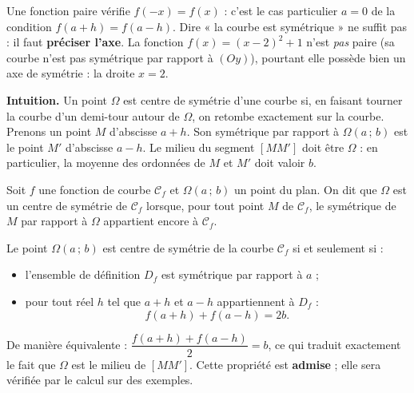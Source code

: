 \documentclass[11pt]{article}
\newcommand{\cle}[1]{{\popxbold\color{popdark}#1}}
\newcounter{popsec}
\newcounter{popsub}
\newcommand{\courssub}[1]{%
  \stepcounter{popsub}%
  \par\vspace{9pt}\noindent{\popxbold\fontsize{11.5}{13}\selectfont\color{popink}{\color{poporange}\thepopsec.\thepopsub}\hspace{6pt}#1}\par\nopagebreak\vspace{4pt}
}
\begin{document}
\begin{attention}[Ne pas confondre axe $(Oy)$ et axe $x = a$]
Une fonction paire vérifie $f(-x) = f(x)$ : c'est le cas particulier $a = 0$ de la condition $f(a+h) = f(a-h)$. Dire « la courbe est symétrique » ne suffit pas : il faut \textbf{préciser l'axe}. La fonction $f(x) = (x-2)^2 + 1$ n'est \emph{pas} paire (sa courbe n'est pas symétrique par rapport à $(Oy)$), pourtant elle possède bien un axe de symétrie : la droite $x = 2$.
\end{attention}

\courssub{Centre de symétrie $\Omega(a\,;\,b)$}

\textbf{Intuition.} Un point $\Omega$ est \cle{centre de symétrie} d'une courbe si, en faisant tourner la courbe d'un demi-tour autour de $\Omega$, on retombe exactement sur la courbe. Prenons un point $M$ d'abscisse $a + h$. Son symétrique par rapport à $\Omega(a\,;\,b)$ est le point $M'$ d'abscisse $a - h$. Le milieu du segment $[MM']$ doit être $\Omega$ : en particulier, la moyenne des ordonnées de $M$ et $M'$ doit valoir $b$.

\begin{definition}
Soit $f$ une fonction de courbe $\mathcal{C}_f$ et $\Omega(a\,;\,b)$ un point du plan. On dit que $\Omega$ est un \cle{centre de symétrie} de $\mathcal{C}_f$ lorsque, pour tout point $M$ de $\mathcal{C}_f$, le symétrique de $M$ par rapport à $\Omega$ appartient encore à $\mathcal{C}_f$.
\end{definition}

\begin{propriete}
Le point $\Omega(a\,;\,b)$ est centre de symétrie de la courbe $\mathcal{C}_f$ si et seulement si :
\begin{itemize}
\item l'ensemble de définition $D_f$ est symétrique par rapport à $a$ ;
\item pour tout réel $h$ tel que $a + h$ et $a - h$ appartiennent à $D_f$ :
\[ f(a + h) + f(a - h) = 2b. \]
\end{itemize}
De manière équivalente : $\dfrac{f(a+h) + f(a-h)}{2} = b$, ce qui traduit exactement le fait que $\Omega$ est le milieu de $[MM']$. Cette propriété est \textbf{admise} ; elle sera vérifiée par le calcul sur des exemples.
\end{propriete}
\end{document}
